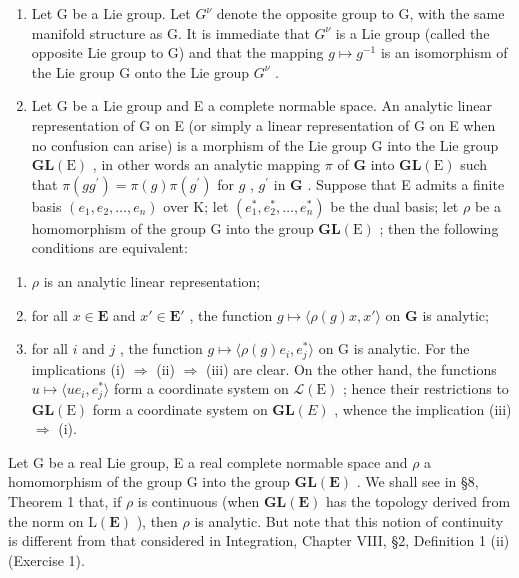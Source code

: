 \begin{enumerate}
\def\labelenumi{(\arabic{enumi})}
\setcounter{enumi}{1}
\item
  Let G be a Lie group. Let \(G^{\nu}\) denote the opposite group to G, with the same manifold structure as G. It is immediate that \(G^{\nu}\) is a Lie group (called the opposite Lie group to G) and that the mapping \(g \mapsto g^{-1}\) is an isomorphism of the Lie group G onto the Lie group \(G^{\nu}\) .
\item
  Let G be a Lie group and E a complete normable space. An analytic linear representation of G on E (or simply a linear representation of G on E when no confusion can arise) is a morphism of the Lie group G into the Lie group \(\mathbf{GL}(\mathrm{E})\) , in other words an analytic mapping \(\pi\) of \(\mathbf{G}\) into \(\mathbf{GL}(\mathrm{E})\) such that \(\pi (gg^{\prime}) = \pi (g)\pi (g^{\prime})\) for \(g\) , \(g^{\prime}\) in \(\mathbf{G}\) . Suppose that E admits a finite basis \((e_1,e_2,\ldots ,e_n)\) over K; let \((e_1^*,e_2^*,\dots ,e_n^*)\) be the dual basis; let \(\rho\) be a homomorphism of the group G into the group \(\mathbf{GL}(\mathrm{E})\) ; then the following conditions are equivalent:
\end{enumerate}

\begin{enumerate}
\def\labelenumi{(\roman{enumi})}
\item
  \(\rho\) is an analytic linear representation;
\item
  for all \(x \in \mathbf{E}\) and \(x' \in \mathbf{E}'\) , the function \(g \mapsto \langle \rho(g)x, x' \rangle\) on \(\mathbf{G}\) is analytic;
\item
  for all \(i\) and \(j\) , the function \(g \mapsto \langle \rho(g)e_i, e_j^*\rangle\) on G is analytic. For the implications (i) \(\Rightarrow\) (ii) \(\Rightarrow\) (iii) are clear. On the other hand, the functions \(u \mapsto \langle ue_i, e_j^*\rangle\) form a coordinate system on \(\mathcal{L}(\mathrm{E})\) ; hence their restrictions to \(\mathbf{GL}(\mathrm{E})\) form a coordinate system on \(\mathbf{GL}(E)\) , whence the implication (iii) \(\Rightarrow\) (i).
\end{enumerate}

Let G be a real Lie group, E a real complete normable space and \(\rho\) a homomorphism of the group G into the group \(\mathbf{GL}(\mathbf{E})\) . We shall see in §8, Theorem 1 that, if \(\rho\) is continuous (when \(\mathbf{GL}(\mathbf{E})\) has the topology derived from the norm on \(\mathrm{L}(\mathbf{E})\) ), then \(\rho\) is analytic. But note that this notion of continuity is different from that considered in Integration, Chapter VIII, §2, Definition 1 (ii) (Exercise 1).


